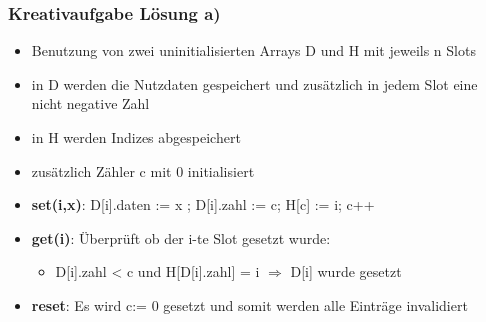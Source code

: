\begin{frame}
	\frametitle{Kreativaufgabe Lösung a)}
	\begin{itemize}
		\item Benutzung von zwei uninitialisierten Arrays D und H mit jeweils n Slots
		\item in D werden die Nutzdaten gespeichert und zusätzlich in jedem Slot eine nicht negative Zahl
		\item in H werden Indizes abgespeichert
		\item zusätzlich Zähler c mit 0 initialisiert
		\item \textbf{set(i,x)}: D[i].daten := x ; D[i].zahl := c; H[c] := i; c++ 
		\item \textbf{get(i)}: Überprüft ob der i-te Slot gesetzt wurde:
			\begin{itemize}
				\item D[i].zahl < c und H[D[i].zahl] = i $\Rightarrow$ D[i] wurde gesetzt
			\end{itemize}
		\item \textbf{reset}: Es wird c:= 0 gesetzt und somit werden alle Einträge invalidiert

	\end{itemize}
\end{frame}

